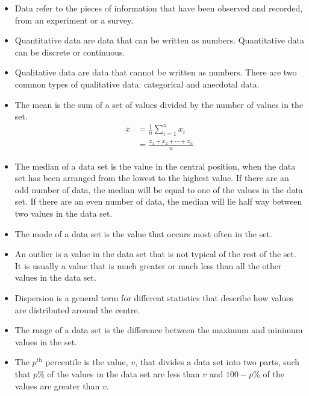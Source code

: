 
\begin{itemize}[itemsep=6pt]
\item Data refer to the pieces of information that have been observed and recorded, from an experiment or a survey. 

\item Quantitative data are data that can be written as numbers.  Quantitative data can be discrete or continuous.

\item Qualitative data are data that cannot be written as numbers.  There are two common types of qualitative data: categorical and anecdotal data. 

\item The mean is the sum of a set of values divided by the number of values in the set. 
  \begin{align*}
    \overline{x} &= \frac{1}{n}\sum_{i=1}^n x_i \\
                 &= \frac{x_1 + x_2 + \cdots + x_n}{n}
  \end{align*}

\item The median of a data set is the value in the central position, when the data set has 
been arranged from the lowest to the highest value.  If there are an odd number of data, the median will be equal to one of the values in the data set. If there are an even number of data, the median will lie half way between two values in the data set. 

\item The mode of a data set is the value that occurs most often in the set. 

\item An outlier is a value in the data set that is not typical of the rest of the set. It is 
usually a value that is much greater or much less than all the other values in the data set.

\item Dispersion is a general term for different statistics that describe how values are distributed around the centre. 

\item The range of a data set is the difference between the maximum and minimum values 
in the set. 

\item The $p^{\mathrm{th}}$ percentile is the value, $v$, that divides a data set into two parts, such that 
$p\%$ of the values in the data set are less than $v$ and $100 − p\%$ of the 
values are greater than $v$. 


\end{itemize}
